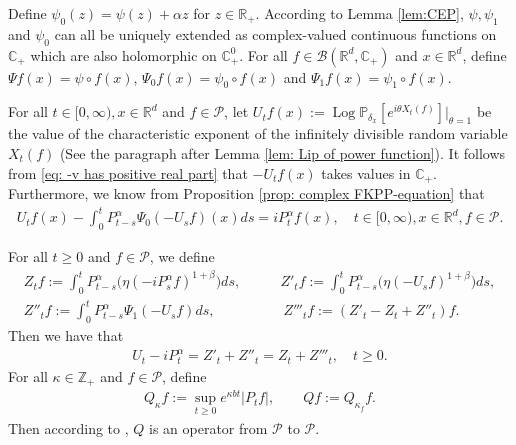 \documentclass[12pt,a4paper]{amsart}
\theoremstyle{plain}
\theoremstyle{definition}
\numberwithin{equation}{section}
\begin{document}
Define $\psi_0(z) = \psi(z) + \alpha z$ for $z\in \mathbb{R}_+$.
According to Lemma \ref{lem:CEP}, $\psi, \psi_1$ and $\psi_0$ can all be uniquely extended as complex-valued continuous functions on $\mathbb C_+$ which are also holomorphic on $\mathbb C^0_+$.
For all $f\in \mathcal B(\mathbb R^d, \mathbb C_+)$ and $x\in \mathbb R^d$, define $\Psi f (x) = \psi\circ f(x)$, $\Psi_0 f(x)= \psi_0 \circ f(x)$ and $\Psi_1 f(x)= \psi_1 \circ f(x)$.

For all $t\in [0,\infty), x\in \mathbb R^d $ and $f \in \mathcal{P}$, let $ U_tf(x) := \operatorname{Log} \mathbb P_{\delta_x}[e^{i\theta X_t(f)}]|_{\theta = 1} $ be the value of the characteristic exponent of the infinitely divisible random variable $X_t(f)$ (See the paragraph after Lemma \ref{lem: Lip of power function}).
It follows from \eqref{eq: -v has positive real part} that $-U_tf(x)$ takes values in $\mathbb C_+$. Furthermore, we know from Proposition \ref{prop: complex FKPP-equation} that
\begin{align}
  \label{eq:chareq2}
  U_tf(x) - \int_0^t P^\alpha_{t-s} \Psi_0(-U_sf)(x)ds
  = i P^{\alpha}_t f(x)
  , \quad t\in [0,\infty), x\in \mathbb{R}^d, f\in \mathcal P.
\end{align}

For all $t\geq 0$ and $f\in \mathcal P$, we define
\begin{align}
  \label{eq: def of Zf}
  Z_t f
  := \int_0^t P^\alpha_{t-s}\big( \eta (-i P^\alpha_sf)^{1+\beta}\big)ds,
  & \qquad Z'_t f
    := \int_0^t P^\alpha_{t-s}\big( \eta (-U_s f)^{1+\beta}\big)ds,
  \\ Z''_t f
  := \int_0^t P^\alpha_{t-s}\Psi_1(-U_s f)ds,
  & \qquad\  Z'''_t f
    := (Z'_t - Z_t+ Z''_t)f.
\end{align}
Then we have that
\begin{align}
  \label{eq: key equality}
  U_t - i P^\alpha_t
  = Z'_t + Z''_t
  = Z_t + Z'''_t
  , \quad t\geq 0.
\end{align}
For all $\kappa \in \mathbb Z_+$ and $f\in \mathcal P$, define
\begin{align}
  \label{eq:Q}
  Q_\kappa f
  := \sup_{t\geq 0} e^{\kappa b t}|P_t f|,
  \qquad  Q f
  := Q_{\kappa_f}f.
\end{align}
Then according to \cite[Fact 1.2]{MarksMilos2018CLT}, $Q$ is an operator from $\mathcal P$ to $\mathcal P$.
\end{document}
